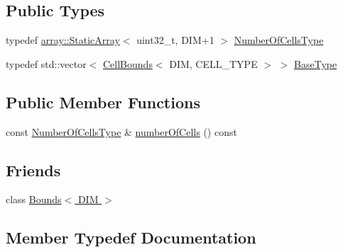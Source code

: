 \subsection*{Public Types}
\begin{DoxyCompactItemize}
\item 
typedef \hyperlink{namespacenifty_1_1array_a683f151f19c851754e0c6d55ed16a0c2}{array\+::\+Static\+Array}$<$ uint32\+\_\+t, D\+IM+1 $>$ \hyperlink{classnifty_1_1cgp_1_1CellBoundsVector_a4db6e267b7ec9e9bfd2db914354c49f9}{Number\+Of\+Cells\+Type}
\item 
typedef std\+::vector$<$ \hyperlink{classnifty_1_1cgp_1_1CellBounds}{Cell\+Bounds}$<$ D\+IM, C\+E\+L\+L\+\_\+\+T\+Y\+PE $>$ $>$ \hyperlink{classnifty_1_1cgp_1_1CellBoundsVector_ae9467b3782214101f6ca95a0219bbbb6}{Base\+Type}
\end{DoxyCompactItemize}
\subsection*{Public Member Functions}
\begin{DoxyCompactItemize}
\item 
const \hyperlink{classnifty_1_1cgp_1_1CellBoundsVector_a4db6e267b7ec9e9bfd2db914354c49f9}{Number\+Of\+Cells\+Type} \& \hyperlink{classnifty_1_1cgp_1_1CellBoundsVector_a7e6c76f3f934b830d3d2ab964909dcf4}{number\+Of\+Cells} () const
\end{DoxyCompactItemize}
\subsection*{Friends}
\begin{DoxyCompactItemize}
\item 
class \hyperlink{classnifty_1_1cgp_1_1CellBoundsVector_a88cb0f4daae12ff33da3c2a17786cd08}{Bounds$<$ D\+I\+M $>$}
\end{DoxyCompactItemize}


\subsection{Member Typedef Documentation}
\mbox{\label{classnifty_1_1cgp_1_1CellBoundsVector_ae9467b3782214101f6ca95a0219bbbb6}} 
